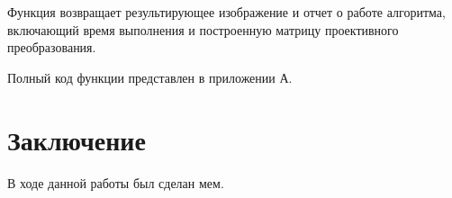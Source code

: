 {{{{   		Функция возвращает результирующее изображение и отчет о работе алгоритма, включающий время выполнения и построенную матрицу проективного преобразования.
   		
   		Полный код функции представлен в приложении А.
   	}
\newpage



\titleformat{\section}{\large\bfseries\centering}{\thesection}{0.5em}{\MakeUppercase}
\titleformat{\subsection}[block]{\bfseries\hspace{1em}}{\thesubsection}{0.5em}{}

\newpage
{}
{}
\section*{Заключение}
{
    В ходе данной работы был сделан мем.
}

\newpage
{}
{}
}}}

